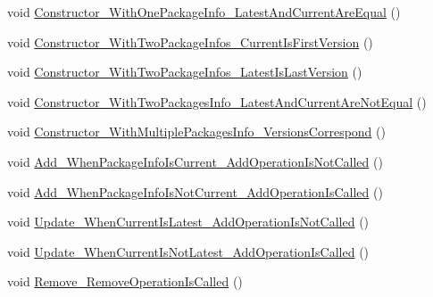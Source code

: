 \begin{DoxyCompactItemize}
void \mbox{\hyperlink{class_unity_editor_1_1_package_manager_1_1_u_i_1_1_tests_1_1_package_tests_a9f1f1f6c8ee528487dcc2d1393200b59}{Constructor\+\_\+\+With\+One\+Package\+Info\+\_\+\+Latest\+And\+Current\+Are\+Equal}} ()
\item 
void \mbox{\hyperlink{class_unity_editor_1_1_package_manager_1_1_u_i_1_1_tests_1_1_package_tests_ac058860230b78ebda8b432bb7f91056c}{Constructor\+\_\+\+With\+Two\+Package\+Infos\+\_\+\+Current\+Is\+First\+Version}} ()
\item 
void \mbox{\hyperlink{class_unity_editor_1_1_package_manager_1_1_u_i_1_1_tests_1_1_package_tests_a1419a2541f435b3c2fe41b2367b2490b}{Constructor\+\_\+\+With\+Two\+Package\+Infos\+\_\+\+Latest\+Is\+Last\+Version}} ()
\item 
void \mbox{\hyperlink{class_unity_editor_1_1_package_manager_1_1_u_i_1_1_tests_1_1_package_tests_a634c9a81083f3cfdac38528b09790117}{Constructor\+\_\+\+With\+Two\+Packages\+Info\+\_\+\+Latest\+And\+Current\+Are\+Not\+Equal}} ()
\item 
void \mbox{\hyperlink{class_unity_editor_1_1_package_manager_1_1_u_i_1_1_tests_1_1_package_tests_aca573e326a53bbb638dcf1cb667d259b}{Constructor\+\_\+\+With\+Multiple\+Packages\+Info\+\_\+\+Versions\+Correspond}} ()
\item 
void \mbox{\hyperlink{class_unity_editor_1_1_package_manager_1_1_u_i_1_1_tests_1_1_package_tests_a05b16e1a8af5ac0450837f5d003e9e8b}{Add\+\_\+\+When\+Package\+Info\+Is\+Current\+\_\+\+Add\+Operation\+Is\+Not\+Called}} ()
\item 
void \mbox{\hyperlink{class_unity_editor_1_1_package_manager_1_1_u_i_1_1_tests_1_1_package_tests_ab1ebdc02e500b94375b6e2c7f1e812f1}{Add\+\_\+\+When\+Package\+Info\+Is\+Not\+Current\+\_\+\+Add\+Operation\+Is\+Called}} ()
\item 
void \mbox{\hyperlink{class_unity_editor_1_1_package_manager_1_1_u_i_1_1_tests_1_1_package_tests_abf77a1325c307c7ed930066919a530c0}{Update\+\_\+\+When\+Current\+Is\+Latest\+\_\+\+Add\+Operation\+Is\+Not\+Called}} ()
\item 
void \mbox{\hyperlink{class_unity_editor_1_1_package_manager_1_1_u_i_1_1_tests_1_1_package_tests_a70cc54a77ed51c945e080d7e5cf4afa8}{Update\+\_\+\+When\+Current\+Is\+Not\+Latest\+\_\+\+Add\+Operation\+Is\+Called}} ()
\item 
void \mbox{\hyperlink{class_unity_editor_1_1_package_manager_1_1_u_i_1_1_tests_1_1_package_tests_aca6eaef1c7c2fa7ad4359e07a0de45ed}{Remove\+\_\+\+Remove\+Operation\+Is\+Called}} ()
\item 

\end{DoxyCompactItemize}
